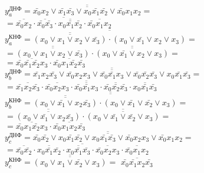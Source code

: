 \documentclass{bmstu}
\begin{document}
	$y^{\text{ДНФ}}_a = \overline{\overline{
	\bar{x_0} x_2 \vee 
	\bar{x_1} \bar{x_3} \vee 
	x_0 \bar{x_1} \bar{x_2} \vee
	\bar{x_0} x_1 x_2
	}} =$ \\
    $= \overline{
    \overline{\bar{x_0} x_2} \cdot
    \overline{\bar{x_0} \bar{x_3}} \cdot
    \overline{x_0 \bar{x_1} \bar{x_2}} \cdot
    \overline{\bar{x_0} x_1 x_2}
	}$ \\
	$y^{\text{КНФ}}_a = \overline{\overline{
	\overline{\overline{
	(x_0 \vee x_1 \vee x_2 \vee \bar{x_3})
	}} \cdot (x_0 \vee \bar{x_1} \vee x_2 \vee x_3)
	}} = $ \\
	$= \overline{\overline{(
	x_0 \vee x_1 \vee x_2 \vee \bar{x_3}
	)}} \cdot \overline{\overline{(x_0 \vee \bar{x_1} \vee x_2 \vee x_3)}} = $ \\
	$= \overline{\bar{x_0} \bar{x_1} \bar{x_2} x_3} \cdot
	\overline{\bar{x_0} x_1 \bar{x_2} \bar{x_3}}$ \\
	
	$y^{\text{ДНФ}}_b = \overline{\overline{
	\bar{x_1} x_2 \bar{x_3} \vee
	\bar{x_0} x_2 x_3 \vee
	\bar{x_0} \bar{x_1} x_3 \vee
	\bar{x_0} \bar{x_2} \bar{x_3} \vee
	x_0 \bar{x_1} \bar{x_3}
	}} = $ \\
	$= \overline{
	\overline{\bar{x_1} x_2 \bar{x_3}} \cdot
	\overline{\bar{x_0} x_2 x_3} \cdot
	\overline{\bar{x_0} \bar{x_1} x_3} \cdot
	\overline{\bar{x_0} \bar{x_2} \bar{x_3}} \cdot
	\overline{x_0 \bar{x_1} \bar{x_3}}
	}$ \\
	$y^{\text{КНФ}}_b = \overline{\overline{
	\overline{\overline{(x_0 \vee \bar{x_1} \vee x_2 \bar{x_3})}} \cdot
	(x_0 \vee \bar{x_1} \vee \bar{x_2} \vee x_3) =
	}}$ \\
	$= \overline{\overline{(x_0 \vee \bar{x_1} \vee x_2 \bar{x_3})}} \cdot
	\overline{\overline{(x_0 \vee \bar{x_1} \vee \bar{x_2} \vee x_3)}} =$ \\
	$= \overline{\bar{x_0} x_1 \bar{x_2} x_3} \cdot
	\overline{\bar{x_0} x_1 x_2 \bar{x_3}}$ \\
	
	$y^{\text{ДНФ}}_c = \overline{\overline{
	\bar{x_0} \bar{x_2} \vee
	x_0 \bar{x_1} \bar{x_2} \vee
	x_0 \bar{x_1} \bar{x_3} \vee
	\bar{x_0} x_2 x_3 \vee
	\bar{x_0} x_1 x_2
	}} =$ \\
	$= \overline{
	\overline{\bar{x_0} \bar{x_2}} \cdot
	\overline{x_0 \bar{x_1} \bar{x_2}} \cdot
	\overline{x_0 \bar{x_1} \bar{x_3}} \cdot
	\overline{\bar{x_0} x_2 x_3} \cdot
	\overline{\bar{x_0} x_1 x_2}
	}$ \\
	$y^{\text{КНФ}}_c = \overline{\overline{
	(x_0 \vee x_1 \vee \bar{x_2} \vee x_3)
	}} =$ 
	$ \overline{\bar{x_0} \bar{x_1} x_2 \bar{x_3}}$ \\
\end{document}
